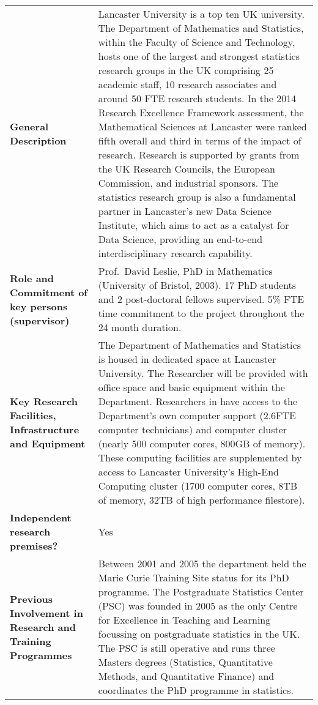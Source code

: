 \documentclass[a4paper,11pt]{article}
\begin{document}
{\fontsize{9bp}{1em}\selectfont %
\noindent\begin{tabular}{>{\raggedright}p{}p{}}
  \multicolumn{2}{l}{\textbf{Beneficiary: Lancaster University}} \\\midrule
\textbf{General Description} & Lancaster University is a top ten UK university.  The Department of Mathematics and Statistics, within the Faculty
of Science and Technology, hosts one of the largest and strongest statistics research groups in the
UK comprising 25 academic staff, 10 research associates and around 50 FTE research students. In the 2014
Research Excellence Framework assessment, the Mathematical Sciences at Lancaster were ranked fifth overall and third in
terms of the impact of research.  Research is supported by grants from the UK Research Councils, the European Commission, and industrial sponsors. The statistics research group is also a fundamental partner in Lancaster's new Data Science Institute, which aims to act as a catalyst for Data Science, providing an end-to-end interdisciplinary research capability. 

\\\midrule
\textbf{Role and Commitment of key persons (supervisor)} &
Prof.\ David Leslie, PhD in Mathematics (University of Bristol, 2003).  17 PhD students and 2 post-doctoral fellows supervised. 5\% FTE time commitment to the project throughout the 24 month duration.
\\\midrule
\textbf{Key Research Facilities, Infrastructure and Equipment} &
The Department of Mathematics and Statistics is housed in dedicated space at Lancaster University.  The Researcher will be provided with office space and basic equipment within the Department. Researchers in have access to the Department's own computer support (2.6FTE computer technicians) and computer cluster (nearly 500 computer cores, 800GB of memory). These computing facilities are supplemented by access to Lancaster University's High-End Computing cluster (1700 computer cores, 8TB of memory, 32TB of high performance filestore).

\\\midrule
\textbf{Independent research premises?} & Yes

\\\midrule
\textbf{Previous Involvement in Research and Training Programmes} &
Between 2001 and 2005 the department held the Marie Curie Training Site status for its PhD programme. The Postgraduate Statistics Center (PSC) was founded in 2005 as the only Centre for Excellence in Teaching and Learning focussing on postgraduate statistics in the UK. The PSC is still operative and runs three Masters degrees (Statistics, Quantitative Methods, and Quantitative Finance) and coordinates the PhD programme in statistics.



\end{tabular}}
\end{document}
